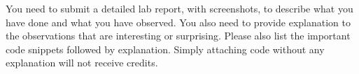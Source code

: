 
You need to submit a detailed lab report, with screenshots,
to describe what you have done and what you have observed.
You also need to provide explanation
to the observations that are interesting or surprising.
Please also list the important code snippets followed by
explanation. Simply attaching code without any explanation will not
receive credits.
